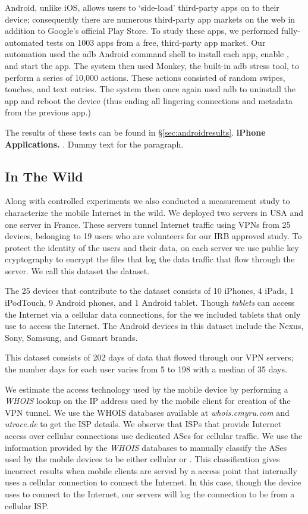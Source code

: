   Android, unlike iOS, allows users to `side-load' third-party apps on to their device; consequently there are numerous third-party app markets on the web in addition to Google's official Play Store.
  To study these apps, we performed fully-automated tests on 1003 apps from a free, third-party app market.
  Our automation used the adb Android command shell to install each app, enable \platname, and start the app.
  The system then used Monkey, the built-in adb stress tool, to perform a series of 10,000 actions. These actions consisted of random swipes, touches, and text entries.
  The system then once again used adb to uninstall the app and reboot the device (thus ending all lingering connections and metadata from the previous app.)

  The results of these tests can be found in \S\ref{sec:androidresults}.
  {\bf iPhone Applications.}
. 
Dummy text for the paragraph.

\subsection{In The Wild}

Along with controlled experiments we also conducted a measurement study to characterize the mobile Internet in the wild.
We deployed two \platname servers in USA and one server in France. 
These servers tunnel Internet traffic using VPNs from 25 devices, belonging to 19 users who are volunteers for our IRB approved study.
To protect the identity of the users and their data, on each server we use public key cryptography to encrypt the files that log the data traffic that flow through the server. 
We call this dataset the \moball dataset. 

The 25 devices that contribute to the \moball dataset consists of 10 iPhones, 4 iPads, 1 iPodTouch, 9 Android phones, and 1 Android tablet.
Though \emph{tablets} can access the Internet via a cellular data connections, for the \moball we included tablets that only use \wifi to access the Internet.
The Android devices in this dataset include the Nexus, Sony, Samsung, and Gsmart brands.

This dataset consists of 202 days of data that flowed through our VPN servers; the number days for each user varies from 5 to 198 with a median of 35 days.

We estimate the access technology used by the mobile device by performing a \emph{WHOIS} lookup on the IP address used by the mobile client for creation of the VPN tunnel. 
We use the WHOIS databases available at \emph{whois.cmyru.com} and \emph{utrace.de} to get the ISP details.
We observe that ISPs that provide Internet access over cellular connections use dedicated ASes for cellular traffic. 
We use the information provided by the \emph{WHOIS} databases to manually classify the ASes used by the mobile devices to be either cellular or \wifi.
This classification gives incorrect results when mobile clients are served by a \wifi access point that internally uses a cellular connection to connect the Internet.
In this case, though the device uses \wifi to connect to the Internet, our servers will log the connection to be from a cellular ISP. 

